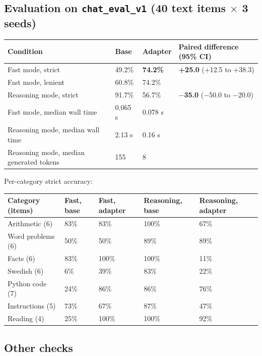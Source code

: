 \documentclass[11pt,a4paper]{article}
\newcommand{\code}[1]{\texttt{#1}}
\begin{document}
\subsection{Evaluation on \code{chat\_eval\_v1} (40 text items $\times$ 3 seeds)}

\begin{table}[H]\centering\small
\begin{tabularx}{\textwidth}{@{}Ylll@{}}
\toprule
Condition & Base & Adapter & Paired difference (95\% CI) \\
\midrule
Fast mode, strict & 49.2\% & \textbf{74.2\%} & \textbf{+25.0} (+12.5 to +38.3) \\
Fast mode, lenient & 60.8\% & 74.2\% &  \\
Reasoning mode, strict & 91.7\% & 56.7\% & \textbf{$-$35.0} ($-$50.0 to $-$20.0) \\
Fast mode, median wall time & 0.065 s & 0.078 s &  \\
Reasoning mode, median wall time & 2.13 s & 0.16 s &  \\
Reasoning mode, median generated tokens & 155 & 8 &  \\
\bottomrule\end{tabularx}\end{table}

Per-category strict accuracy:

\begin{table}[H]\centering\small
\begin{tabularx}{\textwidth}{@{}Yllll@{}}
\toprule
Category (items) & Fast, base & Fast, adapter & Reasoning, base & Reasoning, adapter \\
\midrule
Arithmetic (6) & 83\% & 83\% & 100\% & 67\% \\
Word problems (6) & 50\% & 50\% & 89\% & 89\% \\
Facts (6) & 83\% & 100\% & 100\% & 11\% \\
Swedish (6) & 6\% & 39\% & 83\% & 22\% \\
Python code (7) & 24\% & 86\% & 86\% & 76\% \\
Instructions (5) & 73\% & 67\% & 87\% & 47\% \\
Reading (4) & 25\% & 100\% & 100\% & 92\% \\
\bottomrule\end{tabularx}\end{table}

\subsection{Other checks}
\end{document}
